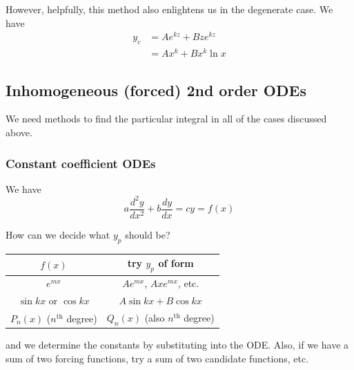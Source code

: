 \documentclass{../template/note}
\begin{document}
    However, helpfully, this method also enlightens us in the degenerate case. We have
    \begin{align*}
        y_c &= Ae^{kz} + Bze^{kz} \\
        &= Ax^k + B x^k \ln x
    \end{align*}
    
    \subsection{Inhomogeneous (forced) 2nd order ODEs}

    We need methods to find the particular integral in all of the cases discussed above.

    \subsubsection{Constant coefficient ODEs}

    We have
    \[
        a \frac{d^2y}{dx^2} + b\frac{dy}{dx} = cy = f(x)
    \]

    How can we decide what \(y_p\) should be?

    \begin{center}
        \begin{tabular}{c c}
            \(f(x)\) & try \(y_p\) of form \\
            \hline
            \(e^{mx}\) & \(Ae^{mx}\), \(Axe^{mx}\), etc. \\
            \(\sin kx\) or \(\cos kx\) & \(A \sin kx + B \cos kx\) \\
            \(P_n(x)\) (\(n^\text{th}\) degree) & \(Q_n(x)\) (also \(n^\text{th}\) degree)
        \end{tabular}
    \end{center}
    
    and we determine the constants by substituting into the ODE. Also, if we have a sum of two forcing functions, try a sum of two candidate functions, etc.
    
\end{document}
